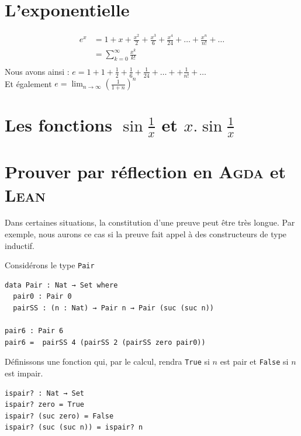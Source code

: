 \section{L'exponentielle}
\begin{align*}
e^x &= 1 + x + \frac{x^2}{2} + \frac{x^3}{6} + \frac{x^4}{24} + \dots + \frac{x^n}{n!} + \dots \\
    &= \sum_{k=0}^{\infty} \frac{x^k}{k!} \\
\end{align*}
Nous avons ainsi : $e= 1+1+\frac{1}{2}+\frac{1}{6} +\frac{1}{24}+ \dots + + \frac{1}{n!} + \dots $ \\
Et également $e = \lim_{n \rightarrow \infty} (\frac{1}{1+n})^n $

\section{Les fonctions $\sin \frac{1}{x}$ et $x . \sin \frac{1}{x}$ }
\begin{center}
\hspace{1cm}
\end{center}
\section{Prouver par réflection en \textsc{Agda} et \textsc{Lean}}
Dans certaines situations, la constitution d'une preuve peut être très longue.
Par exemple, nous aurons ce cas si la preuve fait appel à des constructeurs de type inductif.

Considérons le type \texttt{Pair}
\begin{verbatim}
data Pair : Nat → Set where
  pair0 : Pair 0
  pairSS : (n : Nat) → Pair n → Pair (suc (suc n))
 
pair6 : Pair 6
pair6 =  pairSS 4 (pairSS 2 (pairSS zero pair0))
\end{verbatim}
Définissons une fonction qui, par le calcul, rendra \texttt{True} si $n$ est pair et \texttt{False} si $n$ est impair.
\begin{verbatim}
ispair? : Nat → Set
ispair? zero = True
ispair? (suc zero) = False
ispair? (suc (suc n)) = ispair? n 
\end{verbatim}

